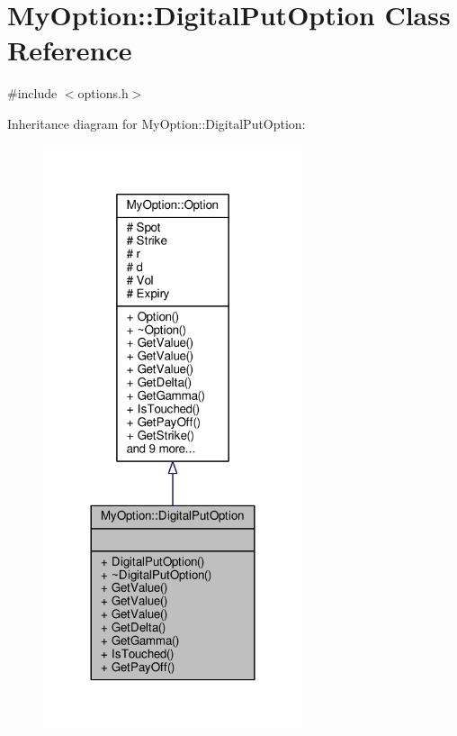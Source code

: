 \hypertarget{classMyOption_1_1DigitalPutOption}{}\section{My\+Option\+:\+:Digital\+Put\+Option Class Reference}
\label{classMyOption_1_1DigitalPutOption}


{\ttfamily \#include $<$options.\+h$>$}



Inheritance diagram for My\+Option\+:\+:Digital\+Put\+Option\+:
\nopagebreak
\begin{figure}[H]
\begin{center}
\leavevmode
\includegraphics[width=216pt]{classMyOption_1_1DigitalPutOption__inherit__graph}
\end{center}
\end{figure}


